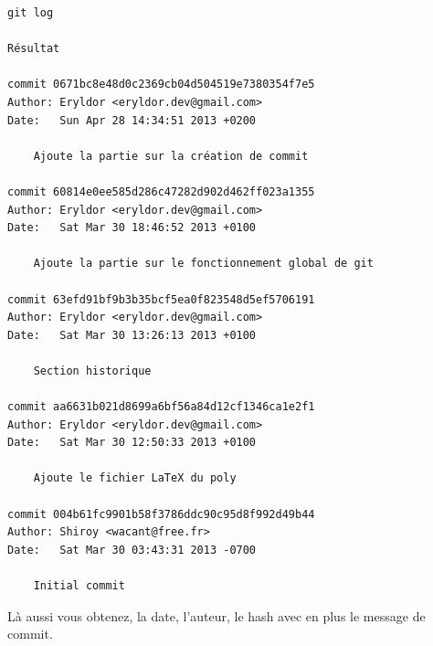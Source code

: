 \documentclass[a4paper]{article}
\begin{document}
\begin{verbatim}
git log

Résultat

commit 0671bc8e48d0c2369cb04d504519e7380354f7e5
Author: Eryldor <eryldor.dev@gmail.com>
Date:   Sun Apr 28 14:34:51 2013 +0200

    Ajoute la partie sur la création de commit

commit 60814e0ee585d286c47282d902d462ff023a1355
Author: Eryldor <eryldor.dev@gmail.com>
Date:   Sat Mar 30 18:46:52 2013 +0100

    Ajoute la partie sur le fonctionnement global de git

commit 63efd91bf9b3b35bcf5ea0f823548d5ef5706191
Author: Eryldor <eryldor.dev@gmail.com>
Date:   Sat Mar 30 13:26:13 2013 +0100

    Section historique

commit aa6631b021d8699a6bf56a84d12cf1346ca1e2f1
Author: Eryldor <eryldor.dev@gmail.com>
Date:   Sat Mar 30 12:50:33 2013 +0100

    Ajoute le fichier LaTeX du poly

commit 004b61fc9901b58f3786ddc90c95d8f992d49b44
Author: Shiroy <wacant@free.fr>
Date:   Sat Mar 30 03:43:31 2013 -0700

    Initial commit
\end{verbatim}

Là aussi vous obtenez, la date, l'auteur, le hash avec en plus le message de commit.
\end{document}
